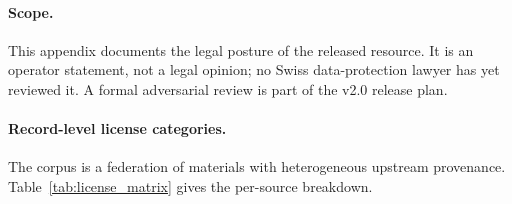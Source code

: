 %

\paragraph{Scope.} This appendix documents the legal posture of the
released resource. It is an operator statement, not a legal opinion;
no Swiss data-protection lawyer has yet reviewed it. A formal
adversarial review is part of the v2.0 release plan.

\paragraph{Record-level license categories.} The corpus is a federation
of materials with heterogeneous upstream provenance. Table~\ref{tab:license_matrix}
gives the per-source breakdown.

